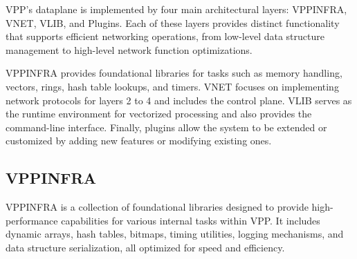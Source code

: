 VPP’s dataplane is implemented by four main architectural layers: VPPINFRA, VNET, VLIB, and Plugins. 
Each of these layers provides distinct functionality that supports efficient networking operations, from low-level data structure management to high-level network function optimizations.

VPPINFRA provides foundational libraries for tasks such as memory handling, vectors, rings, hash table lookups, and timers. 
VNET focuses on implementing network protocols for layers 2 to 4 and includes the control plane. 
VLIB serves as the runtime environment for vectorized processing and also provides the command-line interface. 
Finally, plugins allow the system to be extended or customized by adding new features or modifying existing ones.~\cite{fdio-vpp-softwarearchitecture-2506}

\subsection{VPPINFRA}
VPPINFRA is a collection of foundational libraries designed to provide high-performance capabilities for various internal tasks within VPP. 
It includes dynamic arrays, hash tables, bitmaps, timing utilities, logging mechanisms, and data structure serialization, all optimized for speed and efficiency.~\cite{fdio-vpp-infrastructure-2506}


